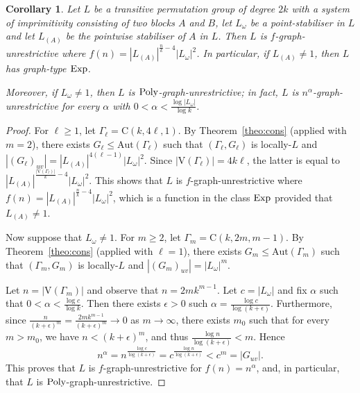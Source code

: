 \documentclass{amsart}
\newtheorem{corollary}[theorem]{Corollary}
\theoremstyle{definition}
\begin{document}
\begin{corollary}\label{cor:cons}
Let $L$ be a transitive permutation group of degree $2k$ with a system of imprimitivity consisting of two blocks $A$ and $B$, let $L_\omega$ be a point-stabiliser in $L$ and let $L_{(A)}$ be the pointwise stabiliser of $A$ in $L$. Then $L$ is $f$-graph-unrestrictive where $f(n)=|L_{(A)}|^{\frac{n}{k}-4} |L_\omega|^2$. In particular, if $L_{(A)}\neq 1$, then $L$ has graph-type ${\mathop{\rm Exp}}$.

Moreover, if  $L_\omega \not = 1$, then $L$ is ${\mathop{\rm Poly}}$-graph-unrestrictive; in fact, $L$ is $n^{\alpha}$-graph-unrestrictive for every $\alpha$ with $0<\alpha < \frac{\log |L_\omega|}{\log k}$. 
\end{corollary}

\begin{proof}
For $\ell\ge 1$, let $\Gamma_\ell = {\mathrm C}(k,4\ell,1)$. By Theorem~\ref{theo:cons} (applied with $m=2$), there exists $G_\ell \le {\mathrm{Aut}}(\Gamma_\ell)$ such that $(\Gamma_\ell,G_\ell)$ is locally-$L$ and $|(G_\ell)_{uv}| =|L_{(A)}|^{4 (\ell -1)} |L_\omega|^2$. Since $|{\mathrm V}(\Gamma_\ell)|=4k\ell$, the latter is equal to $|L_{(A)}|^{\frac{|{\mathrm V}(\Gamma_\ell)|}{k} -4} |L_\omega|^2$. This shows that $L$ is $f$-graph-unrestrictive where $f(n)=|L_{(A)}|^{\frac{n}{k}-4} |L_\omega|^2$, which is a function in the class ${\mathop{\rm Exp}}$ provided that $L_{(A)} \not =1$.

Now suppose that $L_\omega\neq 1$. For $m\geq 2$, let $\Gamma_m ={\mathrm C}(k,2m,m-1)$. By Theorem~\ref{theo:cons} (applied with $\ell = 1$),
there exists $G_m \le {\mathrm{Aut}}(\Gamma_m)$ such that $(\Gamma_m,G_m)$ is locally-$L$ and $|(G_m)_{uv}| =|L_\omega|^m$. 

Let $n=|{\mathrm V}(\Gamma_m)|$ and observe that $n= 2mk^{m-1}$. Let $c=|L_\omega|$ and fix  $\alpha$ such that $0<\alpha < \frac{\log c}{\log k}$.  Then there exists $\epsilon >0$ such $\alpha = \frac{\log c}{\log (k+\epsilon)}$. Furthermore, since $\frac{n}{(k+\epsilon)^m}=\frac{2mk^{m-1}}{(k+\epsilon)^m} \to 0$ as $m\to \infty$, there exists $m_0$ such that for every $m>m_0$, we have $n < (k+\epsilon)^m$, and thus $\frac{\log n}{\log(k+\epsilon)} < m$.
Hence
$$
 n^\alpha = n^{\frac{\log c}{\log (k+\epsilon)}} = c^{\frac{\log n}{\log (k+\epsilon)}} < c^m = |G_{uv}|.
$$
This proves that $L$ is $f$-graph-unrestrictive for $f(n) = n^\alpha$, and, in particular, that $L$ is ${\mathop{\rm Poly}}$-graph-unrestrictive.

\end{proof}
\end{document}
